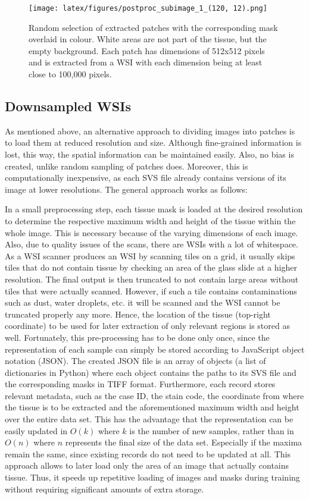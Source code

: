 \begin{figure}[h!t]
    \centering
    \texttt{[image: latex/figures/postproc\_subimage\_1\_(120, 12).png]}
    \caption[Patch extraction]{Random selection of extracted patches with the corresponding mask overlaid in colour. White areas are not part of the tissue, but the empty background. Each patch has dimensions of 512x512 pixels and is extracted from a WSI with each dimension being at least close to 100,000 pixels.}
    \label{fig:patches}
\end{figure}

\subsection{Downsampled WSIs}
    \label{DownsampleData}
As mentioned above, an alternative approach to dividing images into patches is to load them at reduced resolution and size. Although fine-grained information is lost, this way, the spatial information can be maintained easily. Also, no bias is created, unlike random sampling of patches does. Moreover, this is computationally inexpensive, as each SVS file already contains versions of its image at lower resolutions. The general approach works as follows:

In a small preprocessing step, each tissue mask is loaded at the desired resolution to determine the respective maximum width and height of the tissue within the whole image. This is necessary because of the varying dimensions of each image. Also, due to quality issues of the scans, there are WSIs with a lot of whitespace. As a WSI scanner produces an WSI by scanning tiles on a grid, it usually skips tiles that do not contain tissue by checking an area of the glass slide at a higher resolution. The final output is then truncated to not contain large areas without tiles that were actually scanned. However, if such a tile contains contaminations such as dust, water droplets, etc. it will be scanned and the WSI cannot be truncated properly any more. Hence, the location of the tissue (top-right coordinate) to be used for later extraction of only relevant regions is stored as well. 
Fortunately, this pre-processing has to be done only once, since the representation of each sample can simply be stored according to JavaScript object notation (JSON). The created JSON file is an array of objects (a list of dictionaries in Python) where each object contains the paths to its SVS file and the corresponding masks in TIFF format. Furthermore, each record stores relevant metadata, such as the case ID, the stain code, the coordinate from where the tissue is to be extracted and the aforementioned maximum width and height over the entire data set. This has the advantage that the representation can be easily updated in \(O(k)\) where \(k\) is the number of new samples, rather than in \(O(n)\) where \(n\) represents the final size of the data set. Especially if the maxima remain the same, since existing records do not need to be updated at all. This approach allows to later load only the area of an image that actually contains tissue. Thus, it speeds up repetitive loading of images and masks during training without requiring significant amounts of extra storage. 

